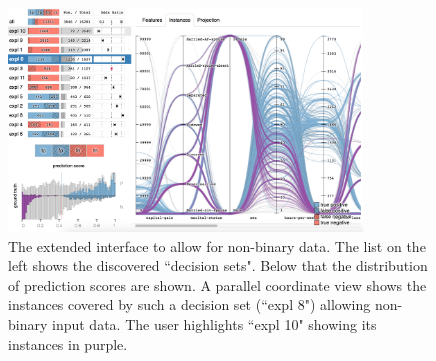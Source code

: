 \begin{figure}[t]
\centering
\includegraphics[height=16em]{figs/new_parallel.png}
\caption{
The extended interface to allow for non-binary data.
The list on the left shows the discovered ``decision sets".
Below that the distribution of prediction scores are shown.
A parallel coordinate view shows the instances covered by such a decision set (``expl 8") allowing non-binary input data.
The user highlights ``expl 10" showing its instances in purple.
}
\vspace*{-1em}
\label{figs:new_parallel}
\end{figure}